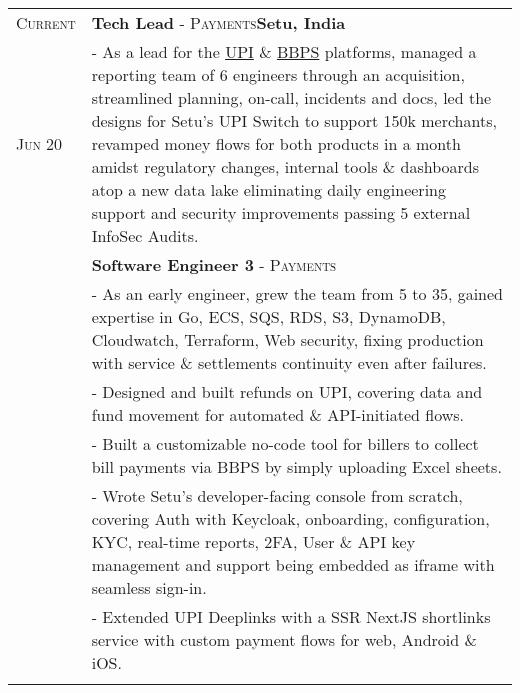 \documentclass[a4paper,10pt]{extarticle} %
\begin{document}
\begin{tabularx}{\linewidth}{ l | X }

\textsc{Current} & \textbf{Tech Lead} \textsc{- Payments}\hfill\textbf{Setu, India}\\
\textsc{Jun 20} & {- As a lead for the \href{https://setu.co/payments/upi-deeplinks}{UPI} \& \href{https://setu.co/payments/bbps}{BBPS} platforms, managed a reporting team of 6 engineers through an acquisition, streamlined planning, on-call, incidents and docs, led the designs for Setu's UPI Switch to support 150k merchants, revamped money flows for both products in a month amidst regulatory changes, internal tools \& dashboards atop a new data lake eliminating daily engineering support and security improvements passing 5 external InfoSec Audits.}\\
& \textbf{Software Engineer 3} \textsc{- Payments}\\
& {- As an early engineer, grew the team from 5 to 35, gained expertise in Go, ECS, SQS, RDS, S3, DynamoDB, Cloudwatch, Terraform, Web security, fixing production with service \& settlements continuity even after failures.}\\
& {- Designed and built refunds on UPI, covering data and fund movement for automated \& API-initiated flows.}\\
& {- Built a customizable no-code tool for billers to collect bill payments via BBPS by simply uploading Excel sheets.}\\
& {- Wrote Setu's developer-facing console from scratch, covering Auth with Keycloak, onboarding, configuration, KYC, real-time reports, 2FA, User \& API key management and support being embedded as iframe with seamless sign-in.}\\
& {- Extended UPI Deeplinks with a SSR NextJS shortlinks service with custom payment flows for web, Android \& iOS.}\\
\multicolumn{2}{c}{} \\


\end{tabularx}
\end{document}
